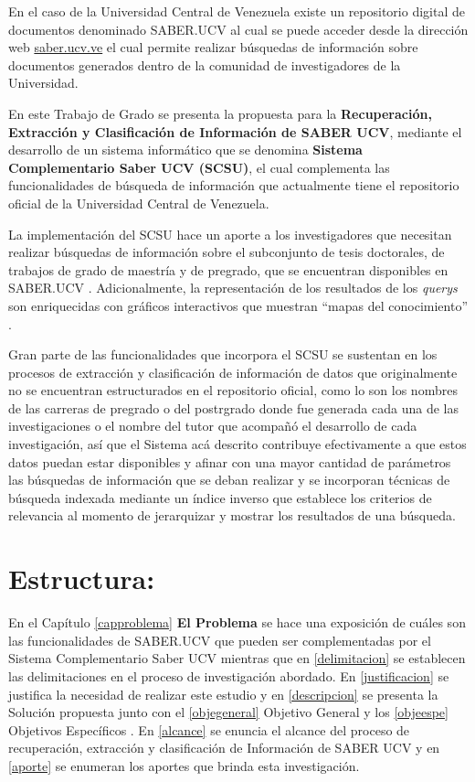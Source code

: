 \documentclass[
  10,
  openany]{book}
\begin{document}
En el caso de la Universidad Central de Venezuela existe un repositorio digital de documentos denominado SABER.UCV al cual se puede acceder desde la dirección web \href{http://saber.ucv.ve/}{saber.ucv.ve} el cual permite realizar búsquedas de información sobre documentos generados dentro de la comunidad de investigadores de la Universidad.

En este Trabajo de Grado se presenta la propuesta para la \textbf{Recuperación, Extracción y Clasificación de Información de SABER UCV}, mediante el desarrollo de un sistema informático que se denomina \textbf{Sistema Complementario Saber UCV (SCSU)}, el cual complementa las funcionalidades de búsqueda de información que actualmente tiene el repositorio oficial de la Universidad Central de Venezuela.

La implementación del SCSU hace un aporte a los investigadores que necesitan realizar búsquedas de información sobre el subconjunto de tesis doctorales, de trabajos de grado de maestría y de pregrado, que se encuentran disponibles en SABER.UCV . Adicionalmente, la representación de los resultados de los \emph{querys} son enriquecidas con gráficos interactivos que muestran ``mapas del conocimiento'' \citep{dueñas2011}.

Gran parte de las funcionalidades que incorpora el SCSU se sustentan en los procesos de extracción y clasificación de información de datos que originalmente no se encuentran estructurados en el repositorio oficial, como lo son los nombres de las carreras de pregrado o del postrgrado donde fue generada cada una de las investigaciones o el nombre del tutor que acompañó el desarrollo de cada investigación, así que el Sistema acá descrito contribuye efectivamente a que estos datos puedan estar disponibles y afinar con una mayor cantidad de parámetros las búsquedas de información que se deban realizar y se incorporan técnicas de búsqueda indexada mediante un índice inverso que establece los criterios de relevancia al momento de jerarquizar y mostrar los resultados de una búsqueda.

\hypertarget{estructura}{%
\section{Estructura:}\label{estructura}}

En el Capítulo \ref{capproblema} \textbf{El Problema} se hace una exposición de cuáles son las funcionalidades de SABER.UCV que pueden ser complementadas por el Sistema Complementario Saber UCV mientras que en \ref{delimitacion} se establecen las delimitaciones en el proceso de investigación abordado. En \ref{justificacion} se justifica la necesidad de realizar este estudio y en \ref{descripcion} se presenta la Solución propuesta junto con el \ref{objegeneral} Objetivo General y los \ref{objeespe} Objetivos Específicos . En \ref{alcance} se enuncia el alcance del proceso de recuperación, extracción y clasificación de Información de SABER UCV y en \ref{aporte} se enumeran los aportes que brinda esta investigación.
\end{document}
